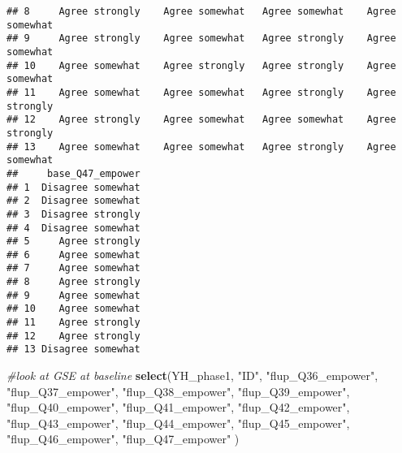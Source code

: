 \documentclass[]{article}
\newenvironment{Shaded}{\begin{snugshade}}{\end{snugshade}}
\newcommand{\KeywordTok}[1]{\textcolor[rgb]{0.13,0.29,0.53}{\textbf{#1}}}
\newcommand{\StringTok}[1]{\textcolor[rgb]{0.31,0.60,0.02}{#1}}
\newcommand{\CommentTok}[1]{\textcolor[rgb]{0.56,0.35,0.01}{\textit{#1}}}
\newcommand{\NormalTok}[1]{#1}
\begin{document}
\begin{verbatim}
## 8     Agree strongly    Agree somewhat   Agree somewhat    Agree somewhat
## 9     Agree strongly    Agree somewhat   Agree strongly    Agree somewhat
## 10    Agree somewhat    Agree strongly   Agree strongly    Agree somewhat
## 11    Agree somewhat    Agree somewhat   Agree strongly    Agree strongly
## 12    Agree strongly    Agree somewhat   Agree somewhat    Agree strongly
## 13    Agree somewhat    Agree somewhat   Agree strongly    Agree somewhat
##     base_Q47_empower
## 1  Disagree somewhat
## 2  Disagree somewhat
## 3  Disagree strongly
## 4  Disagree somewhat
## 5     Agree strongly
## 6     Agree somewhat
## 7     Agree somewhat
## 8     Agree strongly
## 9     Agree somewhat
## 10    Agree somewhat
## 11    Agree strongly
## 12    Agree strongly
## 13 Disagree somewhat
\end{verbatim}

\begin{Shaded}
\begin{Highlighting}[]
\CommentTok{#look at GSE at baseline}
\KeywordTok{select}\NormalTok{(YH_phase1, }\StringTok{"ID"}\NormalTok{, }
 \StringTok{"flup_Q36_empower"}\NormalTok{, }\StringTok{"flup_Q37_empower"}\NormalTok{, }\StringTok{"flup_Q38_empower"}\NormalTok{, }\StringTok{"flup_Q39_empower"}\NormalTok{, }
 \StringTok{"flup_Q40_empower"}\NormalTok{, }\StringTok{"flup_Q41_empower"}\NormalTok{, }\StringTok{"flup_Q42_empower"}\NormalTok{, }\StringTok{"flup_Q43_empower"}\NormalTok{, }
 \StringTok{"flup_Q44_empower"}\NormalTok{, }\StringTok{"flup_Q45_empower"}\NormalTok{, }\StringTok{"flup_Q46_empower"}\NormalTok{, }\StringTok{"flup_Q47_empower"}
\NormalTok{)}
\end{Highlighting}
\end{Shaded}
\end{document}
